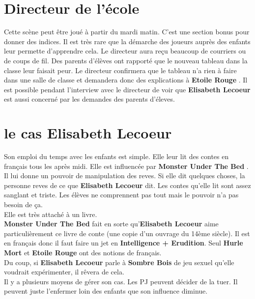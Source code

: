 \documentclass[oneside,12pt]{book}
\newcommand{\Lynn}{\textbf{Etoile Rouge} }
\newcommand{\Peter}{\textbf{Hurle Mort} }
\newcommand{\Leonard}{\textbf{Sombre Bois} }
\newcommand{\Monster}{\textbf{Monster Under The Bed} }
\newcommand{\Elisabeth}{\textbf{Elisabeth Lecoeur} }
\begin{document}
\begin{flushleft}
\section{Directeur de l'école}
Cette scène peut être joué à partir du mardi matin. C'est une section bonus pour donner des indices. Il est très rare que la démarche des joueurs auprès des enfants leur permette d'apprendre cela. 
Le directeur aura reçu beaucoup de courriers ou de coups de fil. Des parents d'élèves ont rapporté que le nouveau tableau dans la classe leur faisait peur. Le directeur confirmera que le tableau n'a rien à faire dans une salle de classe et demandera donc des explications à \Lynn. Il est possible pendant l'interview avec le directeur de voir que \Elisabeth est aussi concerné par les demandes des parents d'éleves.


\section{le cas \Elisabeth}
Son emploi du temps avec les enfants est simple. Elle leur lit des contes en français tous les après midi. Elle est influencée par \Monster . Il lui donne un pouvoir de manipulation des reves. Si elle dit quelques choses, la personne reves de ce que \Elisabeth dit. Les contes qu'elle lit sont assez sanglant et triste. Les élèves ne comprennent pas tout mais le pouvoir n'a pas besoin de ça. \\ 
Elle est très attaché à un livre. \\ 
\Monster fait en sorte qu'\Elisabeth aime particulièrement ce livre de conte (une copie d'un ouvrage du 14ème siècle). Il est en français donc il faut faire un jet en \textbf{Intelligence + Erudition}. Seul \Peter et \Lynn ont des notions de français. \\

Du coup, si \Elisabeth parle à \Leonard de jeu sexuel qu'elle voudrait expérimenter, il rêvera de cela. \\

Il y a plusieurs moyens de gérer son cas. Les PJ peuvent décider de la tuer. Il peuvent juste l'enfermer loin des enfants que son influence diminue. \\ 


\end{flushleft}
\end{document}
